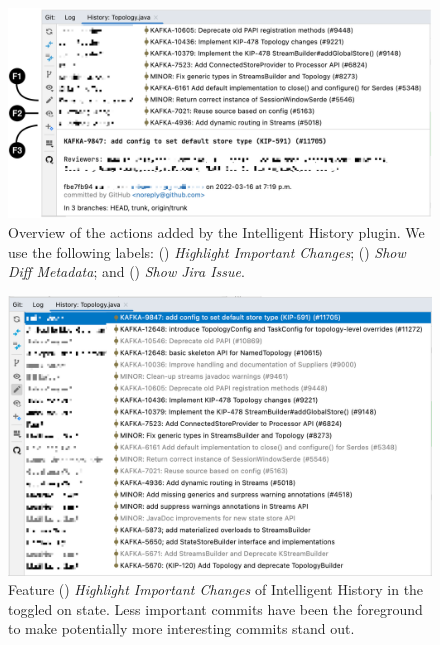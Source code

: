 \begin{figure}
    \includegraphics[width=\textwidth]{./images/intelligent-history-overview.png}
    \caption{
        Overview of the actions added by the Intelligent History plugin. 
        We use the following labels: () \textit{Highlight Important Changes}; () \textit{Show Diff Metadata}; and () \textit{Show Jira Issue}.
    }
    \label{fig:Intelligent-History-Overview}
\end{figure}

\begin{figure}
    \includegraphics[width=\textwidth]{./images/intelligent-history-A.png}
    \caption{
        Feature () \textit{Highlight Important Changes} of Intelligent History in the toggled on state. 
        Less important commits have been  the foreground to make potentially more interesting commits stand out.
    }
    \label{fig:Intelligent-History-A}
\end{figure}

